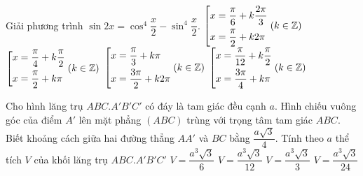 \begin{ex}%
	Giải phương trình $\sin 2x={\cos}^4\dfrac{x}{2} - {\sin}^4\dfrac{x}{2}$.
	\choice
	{\True $\left[\begin{aligned}& x=\dfrac{\pi}{6} + k\dfrac{2\pi}{3} \\
			& x=\dfrac{\pi}{2} + k2\pi\end{aligned}\right. (k\in \mathbb{Z})$}
	{$\left[\begin{aligned}& x=\dfrac{\pi}{4} + k\dfrac{\pi}{2} \\
			& x=\dfrac{\pi}{2} + k\pi\end{aligned}\right. (k\in \mathbb{Z})$}
	{$\left[\begin{aligned}& x=\dfrac{\pi}{3} + k\pi \\
			& x=\dfrac{3\pi}{2} + k2\pi\end{aligned}\right. (k\in \mathbb{Z})$}
	{$\left[\begin{aligned}&x=\dfrac{\pi}{12} + k\dfrac{\pi}{2} \\
			& x=\dfrac{3\pi}{4} + k\pi\end{aligned}\right. (k\in \mathbb{Z})$}
\end{ex}

\begin{ex}%
	Cho hình lăng trụ $ABC.A'B'C'$ có đáy là tam giác đều cạnh $a$. Hình chiếu vuông góc của điểm $A'$ lên mặt phẳng $\left(ABC\right)$ trùng với trọng tâm tam giác $ABC$. Biết khoảng cách giữa hai đường thẳng $AA'$ và $BC$ bằng $\dfrac{a\sqrt{3}}{4}$. Tính theo $a$ thể tích $V$ của khối lăng trụ $ABC.A'B'C'$
	\choice
	{$V=\dfrac{a^3\sqrt{3}}{6}$}
	{\True$V=\dfrac{a^3\sqrt{3}}{12}$}
	{$V=\dfrac{a^3\sqrt{3}}{3}$}
	{$V=\dfrac{a^3\sqrt{3}}{24}$}
\end{ex}

